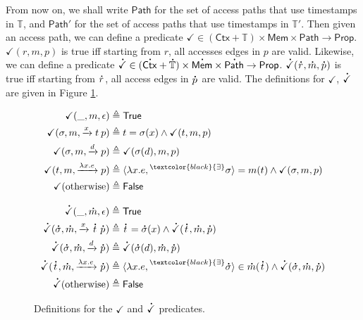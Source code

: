 \documentclass[acmsmall,screen,review]{acmart}\settopmatter{printfolios=true,printccs=false,printacmref=false}
\newcommand*{\prexists}[2][black]{\prescript{\textcolor{#1}{\exists}}{}{#2}}
\newcommand*{\A}[1]{\overset{\,_{\mbox{\Large .}}}{#1}}
\newcommand*{\modid}{d}
\newcommand*{\Time}{\mathbb{T}}
\newcommand*{\ctx}{\sigma}
\newcommand*{\Ctx}{\mathsf{Ctx}}
\newcommand*{\Mem}{\mathsf{Mem}}
\newcommand*{\mem}{m}
\newcommand*{\valid}{\checkmark}
\newcommand*{\Path}{\mathsf{Path}}
\begin{document}
From now on, we shall write $\Path$ for the set of access paths that use timestamps in $\Time$, and $\Path'$ for the set of access paths that use timestamps in $\Time'$.
Then given an access path, we can define a predicate $\valid\in(\Ctx+\Time)\times\Mem\times\Path\rightarrow\mathsf{Prop}$.
$\valid(r,\mem,p)$ is true iff starting from $r$, all accesses edges in $p$ are valid.
Likewise, we can define a predicate $\A\valid\in(\A\Ctx+\A\Time)\times\A\Mem\times\A\Path\rightarrow\mathsf{Prop}$.
$\A\valid(\A{r},\A\mem,\A{p})$ is true iff starting from $\A{r}$, all access edges in $\A{p}$ are valid.
The definitions for $\valid$, $\A\valid$ are given in Figure \ref{fig:valid}.
\begin{figure}[t!]
  \centering
  \begin{minipage}{0.4\linewidth}
    \footnotesize
    \begin{align*}
      \valid(\_,\mem,\epsilon)                  & \triangleq\mathsf{True}                                                              \\
      \valid(\ctx,\mem,\xrightarrow{x}t\:p)     & \triangleq t=\ctx(x)\wedge\valid(t,\mem,p)                                           \\
      \valid(\ctx,\mem,\xrightarrow{\modid}p)   & \triangleq\valid(\ctx(\modid),\mem,p)                                                \\
      \valid(t,\mem,\xrightarrow{\lambda x.e}p) & \triangleq\langle\lambda x.e,\prexists{\ctx}\rangle=\mem(t)\wedge\valid(\ctx,\mem,p) \\
      \valid(\text{otherwise})                  & \triangleq\mathsf{False}
    \end{align*}
  \end{minipage}
  \begin{minipage}{0.4\linewidth}
    \footnotesize
    \begin{align*}
      \A\valid(\_,\A\mem,\epsilon)                          & \triangleq\mathsf{True}                                                                                      \\
      \A\valid(\A{\ctx},\A\mem,\xrightarrow{x}\A{t}\:\A{p}) & \triangleq\A{t}=\A{\ctx}(x)\wedge\A\valid(\A{t},\A\mem,\A{p})                                                \\
      \A\valid(\A{\ctx},\A\mem,\xrightarrow{\modid}\A{p})   & \triangleq\A\valid(\A{\ctx}(\modid),\A\mem,\A{p})                                                            \\
      \A\valid(\A{t},\A\mem,\xrightarrow{\lambda x.e}\A{p}) & \triangleq\langle\lambda x.e,\prexists{\A{\ctx}}\rangle\in\A\mem(\A{t})\wedge\A\valid(\A{\ctx},\A\mem,\A{p}) \\
      \A\valid(\text{otherwise})                            & \triangleq\mathsf{False}
    \end{align*}
  \end{minipage}
  \caption{Definitions for the $\valid$ and $\A\valid$ predicates.}
  \label{fig:valid}
\end{figure}
\end{document}
